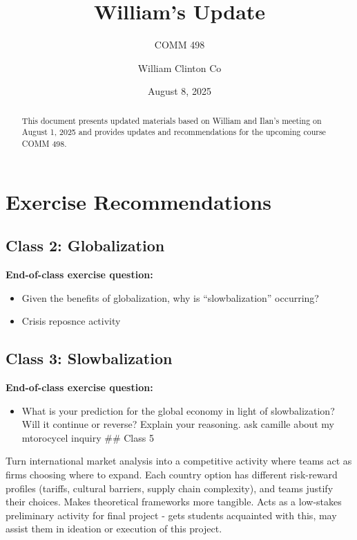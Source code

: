 \documentclass[
  11pt,
]{article}
\title{William's Update}
\subtitle{COMM 498}
\author{William Clinton Co}
\date{August 8, 2025}
\providecommand{\tightlist}{%
  \setlength{\itemsep}{0pt}\setlength{\parskip}{0pt}}
\renewcommand*\contentsname{Table of contents}
\newcommand\contentsname{Table of contents}
\begin{document}
\maketitle
\begin{abstract}
This document presents updated materials based on William and Ilan's
meeting on August 1, 2025 and provides updates and recommendations for
the upcoming course COMM 498.
\end{abstract}

\renewcommand*\contentsname{Table of contents}
{
\hypersetup{linkcolor=}
\setcounter{tocdepth}{3}
\tableofcontents
}

\section{Exercise Recommendations}\label{exercise-recommendations}

\subsection{Class 2: Globalization}\label{class-2-globalization}

\textbf{End-of-class exercise question:}

\begin{itemize}
\tightlist
\item
  Given the benefits of globalization, why is ``slowbalization''
  occurring?
\item
  Crisis reposnce activity
\end{itemize}

\subsection{Class 3: Slowbalization}\label{class-3-slowbalization}

\textbf{End-of-class exercise question:}

\begin{itemize}
\tightlist
\item
  What is your prediction for the global economy in light of
  slowbalization? Will it continue or reverse? Explain your reasoning.
  ask camille about my mtorocycel inquiry \#\# Class 5
\end{itemize}

Turn international market analysis into a competitive activity where
teams act as firms choosing where to expand. Each country option has
different risk-reward profiles (tariffs, cultural barriers, supply chain
complexity), and teams justify their choices. Makes theoretical
frameworks more tangible. Acts as a low-stakes preliminary activity for
final project - gets students acquainted with this, may assist them in
ideation or execution of this project.
\end{document}
